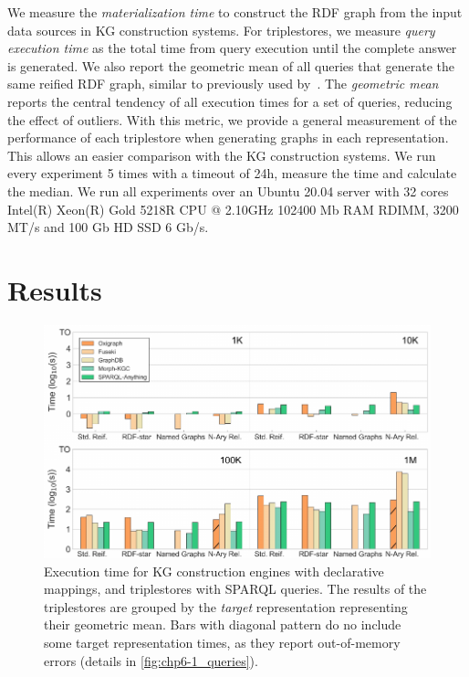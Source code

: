 We measure the \textit{materialization time} to construct the RDF graph from the input data sources in KG construction systems.
For triplestores, we measure \textit{query execution time} as the total time from query execution until the complete answer is generated. 
We also report the geometric mean of all queries that generate the same reified RDF graph, similar to previously used by~\parencite{morsey2011dbpedia,schmidt2009sp}. 
The \textit{geometric mean} reports the central tendency of all execution times for a set of queries, reducing the effect of outliers. 
With this metric, we provide a general measurement of the performance of each triplestore when generating graphs in each representation. 
This allows an easier comparison with the KG construction systems. 
We run every experiment 5 times with a timeout of 24h, measure the time and calculate the median.
We run all experiments over an Ubuntu 20.04 server with
32 cores Intel(R) Xeon(R) Gold 5218R CPU @ 2.10GHz
102400 Mb RAM RDIMM, 3200 MT/s and 
100 Gb HD SSD 6 Gb/s. 




\section{Results}
\label{sec:chp6-1_results}


\begin{figure}[t!]
    \centering
    \includegraphics[width=\linewidth]{figures/chp6-1_results-map-queries.pdf}
    \caption[Overall execution times of KG re-construction evaluation]{Execution time for KG construction engines with declarative mappings, and triplestores with SPARQL queries. The results of the triplestores are grouped by the \textit{target} representation representing their geometric mean. Bars with diagonal pattern do no include some target representation times, as they report out-of-memory errors (details in \cref{fig:chp6-1_queries}).}
    \label{fig:chp6-1_map-queries}
\end{figure}


